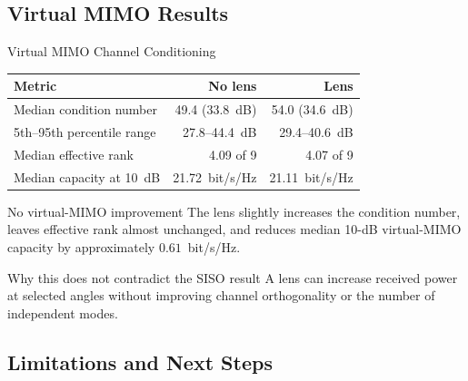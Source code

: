 \subsection{Virtual MIMO Results}

\begin{frame}[t,shrink=12]{Virtual MIMO Channel Conditioning}
    \centering
    \small
    \begin{tabular}{lrr}
        \toprule
        \textbf{Metric} & \textbf{No lens} & \textbf{Lens} \\
        \midrule
        Median condition number & 49.4 (33.8~dB) & 54.0 (34.6~dB) \\
        5th--95th percentile range & 27.8--44.4~dB & 29.4--40.6~dB \\
        Median effective rank & 4.09 of 9 & 4.07 of 9 \\
        Median capacity at 10~dB & 21.72~bit/s/Hz & 21.11~bit/s/Hz \\
        \bottomrule
    \end{tabular}

    \vspace{5mm}
    \begin{alertblock}{No virtual-MIMO improvement}
        The lens slightly increases the condition number, leaves effective
        rank almost unchanged, and reduces median 10-dB virtual-MIMO capacity
        by approximately $0.61$~bit/s/Hz.
    \end{alertblock}
    \begin{exampleblock}{Why this does not contradict the SISO result}
        A lens can increase received power at selected angles without
        improving channel orthogonality or the number of independent modes.
    \end{exampleblock}
\end{frame}

\subsection{Limitations and Next Steps}

